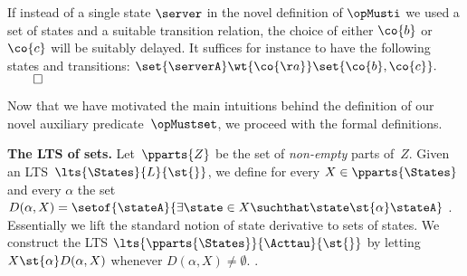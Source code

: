 \begin{example}
  If instead of a single state $\server$ in the novel definition of
  $\opMusti$ we used a set of %
  states and a suitable
  transition relation, the choice of either $\co{b}$ or $\co{c}$ will be
  suitably delayed. It suffices for instance to have the following states and transitions:
  $\set{\serverA} \wt{\co{\aa}} \set{\co{b}, \co{c}}.$\hfill$\qed$
\end{example}

Now that we have motivated the main intuitions behind the definition of our
novel auxiliary predicate~$\opMustset$, we proceed with the formal definitions.

{\bfseries The LTS of sets.}
Let~$\pparts{ Z }$ be the set of  {\em non-empty} parts of~$Z$.
Given an LTS~$\lts{\States}{ L }{ \st{} }$, we define
for every $ X \in \pparts{ \States } $ and every $\alpha$ the set
$D{(\alpha, X)} = \setof{ \stateA }{ \exists \state \in X \suchthat \state \st{\alpha} \stateA }$
.
Essentially we lift the standard notion of state derivative to sets of states.
We construct the LTS $\lts{\pparts{ \States }}{ \Acttau }{ \st{} }$
by letting $ X \st{ \alpha } D{(\alpha, X)}$ whenever $D{(\alpha, X)} \neq \emptyset$.
.

